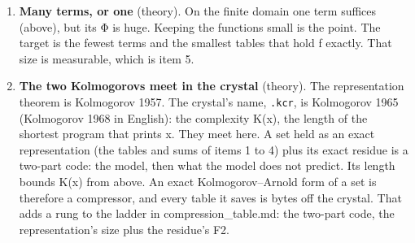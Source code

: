 \begin{enumerate}
\item \textbf{Many terms, or one} (theory). On the finite domain one term suffices (above), but its Φ is huge. Keeping the functions small is the point. The target is the fewest terms and the smallest tables that hold f exactly. That size is measurable, which is item 5.
\item \textbf{The two Kolmogorovs meet in the crystal} (theory). The representation theorem is Kolmogorov 1957. The crystal's name, \texttt{.\allowbreak{}kcr}, is Kolmogorov 1965 (Kolmogorov 1968 in English): the complexity K(x), the length of the shortest program that prints x. They meet here. A set held as an exact representation (the tables and sums of items 1 to 4) plus its exact residue is a two-part code: the model, then what the model does not predict. Its length bounds K(x) from above. An exact Kolmogorov–Arnold form of a set is therefore a compressor, and every table it saves is bytes off the crystal. That adds a rung to the ladder in compression\_\allowbreak{}table.md: the two-part code, the representation's size plus the residue's F2.
\end{enumerate}

